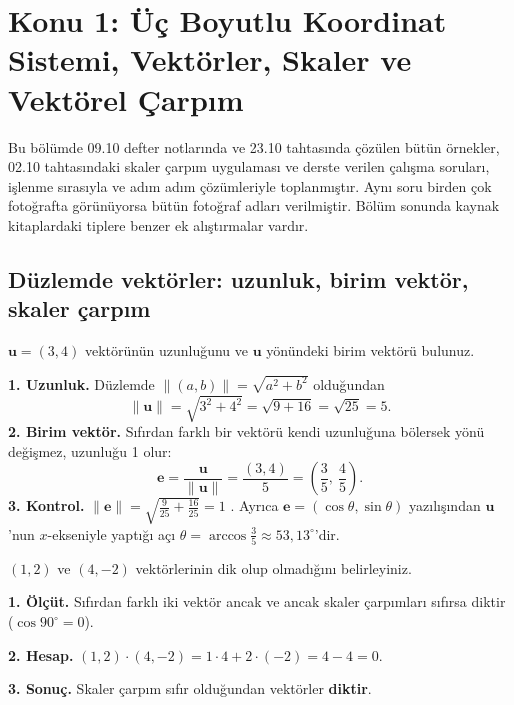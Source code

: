 \section{Konu 1: Üç Boyutlu Koordinat Sistemi, Vektörler, Skaler ve Vektörel Çarpım}

\begin{bilgi}
Bu bölümde 09.10 defter notlarında ve 23.10 tahtasında çözülen bütün örnekler, 02.10 tahtasındaki skaler çarpım uygulaması ve derste verilen çalışma soruları, işlenme sırasıyla ve adım adım çözümleriyle toplanmıştır. Aynı soru birden çok fotoğrafta görünüyorsa bütün fotoğraf adları verilmiştir. Bölüm sonunda kaynak kitaplardaki tiplere benzer ek alıştırmalar vardır.
\end{bilgi}

\subsection{Düzlemde vektörler: uzunluk, birim vektör, skaler çarpım}

\begin{soru}
$\mathbf u=(3,4)$ vektörünün uzunluğunu ve $\mathbf u$ yönündeki birim vektörü bulunuz.
\end{soru}
\begin{cevap}
\textbf{1. Uzunluk.} Düzlemde $\|(a,b)\|=\sqrt{a^2+b^2}$ olduğundan
\[
\|\mathbf u\|=\sqrt{3^2+4^2}=\sqrt{9+16}=\sqrt{25}=5 .
\]
\textbf{2. Birim vektör.} Sıfırdan farklı bir vektörü kendi uzunluğuna bölersek yönü değişmez, uzunluğu 1 olur:
\[
\mathbf e=\frac{\mathbf u}{\|\mathbf u\|}=\frac{(3,4)}{5}=\left(\frac35,\ \frac45\right).
\]
\textbf{3. Kontrol.} $\|\mathbf e\|=\sqrt{\frac{9}{25}+\frac{16}{25}}=1$ \checkmark. Ayrıca $\mathbf e=(\cos\theta,\sin\theta)$ yazılışından $\mathbf u$'nun $x$-ekseniyle yaptığı açı $\theta=\arccos\frac35\approx53{,}13^\circ$'dir.
\end{cevap}

\begin{soru}
$(1,2)$ ve $(4,-2)$ vektörlerinin dik olup olmadığını belirleyiniz.
\end{soru}
\begin{cevap}
\textbf{1. Ölçüt.} Sıfırdan farklı iki vektör ancak ve ancak skaler çarpımları sıfırsa diktir ($\cos90^\circ=0$).

\textbf{2. Hesap.} $(1,2)\cdot(4,-2)=1\cdot4+2\cdot(-2)=4-4=0$.

\textbf{3. Sonuç.} Skaler çarpım sıfır olduğundan vektörler \textbf{diktir}.
\end{cevap}

